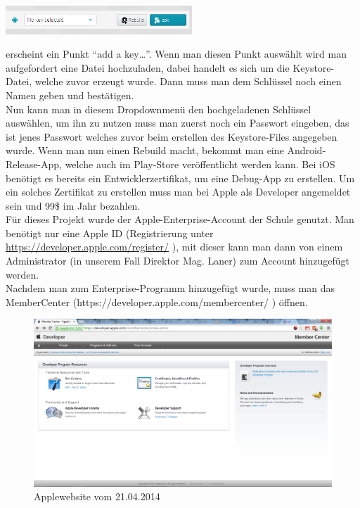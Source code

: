 \includegraphics[keepaspectratio=true, width=7cm]{images/phoneGap/PhoneGap3.png}

erscheint ein Punkt \enquote{add a key…}. Wenn man diesen Punkt auswählt wird man aufgefordert eine Datei hochzuladen, dabei handelt es sich um die Keystore-Datei, welche zuvor erzeugt wurde. Dann muss man dem Schlüssel noch einen Namen geben und bestätigen.\\
Nun kann man in diesem Dropdownmenü den hochgeladenen Schlüssel auswählen, um ihn zu nutzen muss man zuerst noch ein Passwort eingeben, das ist jenes Passwort welches zuvor beim erstellen des Keystore-Files angegeben wurde. Wenn man nun einen Rebuild macht, bekommt man eine Android-Release-App, welche auch im Play-Store veröffentlicht werden kann.
Bei iOS benötigt es bereits ein Entwicklerzertifikat, um eine Debug-App zu erstellen. Um ein solches Zertifikat zu erstellen muss man bei Apple als Developer angemeldet sein und 99\$ im Jahr bezahlen.\\
Für dieses Projekt wurde der Apple-Enterprise-Account der Schule genutzt. Man benötigt nur eine Apple ID (Registrierung unter \href{https://developer.apple.com/register/}{https://developer.apple.com/register/} ), mit dieser kann man dann von einem Administrator (in unserem Fall Direktor Mag. Laner) zum Account hinzugefügt werden.\\
Nachdem man zum Enterprise-Programm hinzugefügt wurde, muss man das MemberCenter (https://developer.apple.com/membercenter/ ) öffnen.\\

\begin{figure}[H]
\includegraphics[keepaspectratio=true, width=14cm]{images/phoneGap/AppleMemberCenter1.png}
\caption{Applewebsite vom 21.04.2014}
\end{figure}

